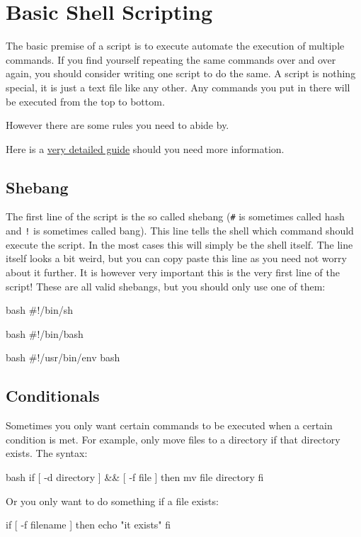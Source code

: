 \section{Basic Shell Scripting}

The basic premise of a script is to execute automate the execution of multiple
commands. If you find yourself repeating the same commands over and over again,
you should consider writing one script to do the same.  A script is nothing
special, it is just a text file like any other. Any commands you put in there
will be executed from the top to bottom.

However there are some rules you need to abide by.

Here is a \href{http://www.tldp.org/LDP/Bash-Beginners-Guide/html/}{very detailed guide} should you need more information.

\subsection{Shebang}
The first line of the script is the so called shebang (\lstinline|#| is sometimes called
hash and \lstinline|!| is sometimes called bang). This line tells the shell which
command should execute the script. In the most cases this will simply be the
shell itself. The line itself looks a bit weird, but you can copy paste this
line as you need not worry about it further. It is however very important this
is the very first line of the script! These are all valid shebangs, but you should
only use one of them:

\begin{code}{bash}
 #!/bin/sh
\end{code}

\begin{code}{bash}
 #!/bin/bash
\end{code}

\begin{code}{bash}
 #!/usr/bin/env bash
\end{code}

\subsection{Conditionals}

Sometimes you only want certain commands to be executed when a certain condition
is met. For example, only move files to a directory if that directory exists.
The syntax:

\begin{code}{bash}
 if [ -d directory ] && [ -f file ]
 then
    mv file directory
 fi

Or you only want to do something if  a file exists:

 if [ -f filename ]
 then
    echo "it exists"
 fi
\end{code}

